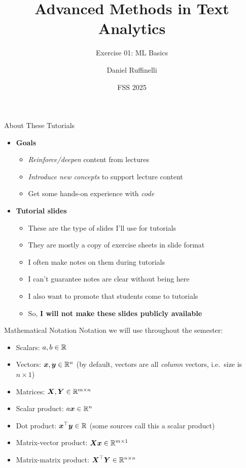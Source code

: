 \documentclass[t]{beamer}
\title[Write your short title here]{Advanced Methods in Text Analytics}
\subtitle{Exercise 01: ML Basics}
\author{Daniel Ruffinelli}
\institute{University of Mannheim}
\date{FSS 2025}
\begin{document}

\begin{frame}
    \titlepage{}
\end{frame}

\begin{frame}{About These Tutorials}{}
    \begin{itemize}
        \item \textbf{Goals}
              \begin{itemize}
                  \item \emph{Reinforce/deepen} content from lectures
                  \item \emph{Introduce new concepts} to support lecture content
                  \item Get some hands-on experience with \emph{code}
              \end{itemize}
        \item \textbf{Tutorial slides}
              \begin{itemize}
                  \item These are the type of slides I'll use for tutorials
                  \item They are mostly a copy of exercise sheets in slide
                        format
                  \item I often make notes on them during tutorials
                  \item I can't guarantee notes are clear without being here
                  \item I also want to promote that students come to tutorials
                  \item So, \textbf{I will not make these slides publicly
                            available}
              \end{itemize}
    \end{itemize}
\end{frame}

\begin{frame}{Mathematical Notation}{}
    Notation we will use throughout the semester:
    \begin{itemize}
        \item Scalars: $a,b\in\mathbb{R}$
        \item Vectors: ${\boldsymbol{x}},{\boldsymbol{y}}\in\mathbb{R}^n$ (by default, vectors are all \emph{column}
              vectors, i.e.\ size is $n\times 1$)
        \item Matrices: ${\boldsymbol{X}},{\boldsymbol{Y}}\in\mathbb{R}^{m\times n}$
        \item Scalar product: $a{\boldsymbol{x}}\in\mathbb{R}^n$
        \item Dot product: ${\boldsymbol{x}}^\top{\boldsymbol{y}}\in\mathbb{R}$ (some sources call this a scalar product)
        \item Matrix-vector product: ${\boldsymbol{X}}{\boldsymbol{x}}\in\mathbb{R}^{m\times 1}$
        \item Matrix-matrix product: ${\boldsymbol{X}}^\top{\boldsymbol{Y}}\in\mathbb{R}^{n\times n}$
    \end{itemize}
\end{frame}
\end{document}
